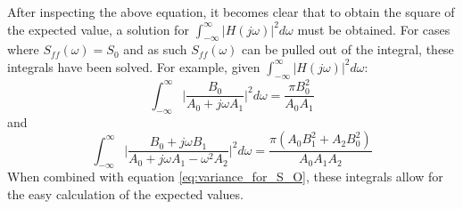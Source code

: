 \documentclass[12pt,letter]{article}
\begin{document}
After inspecting the above equation, it becomes clear that to obtain the square of the expected value, a solution for  $\int_{-\infty}^{\infty} |H(j\omega)|^2 d\omega$ must be obtained. For cases where $S_{ff}(\omega) = S_0$ and as such $S_{ff}(\omega)$ can be pulled out of the integral, these integrals have been solved\protect\footnotemark[1]. For example, given $\int_{-\infty}^{\infty} |H(j\omega)|^2 d\omega$:
\begin{equation}
\int_{-\infty}^{\infty} \bigg|\frac{B_0}{A_0+j \omega A_1} \bigg|^2 d\omega = \frac{\pi B_0^2}{A_0 A_1}
\end{equation} 
and
\begin{equation}
\int_{-\infty}^{\infty} \bigg|\frac{B_0 + j \omega B_1}{A_0+j \omega A_1 - \omega^2 A_2} \bigg|^2 d\omega = \frac{\pi (A_0 B_1^2 + A_2 B_0^2)}{A_0 A_1 A_2}
\end{equation} 
When combined with equation \ref{eq:variance_for_S_O}, these integrals allow for the easy calculation of the expected values. 


\pagebreak		
\end{document}
